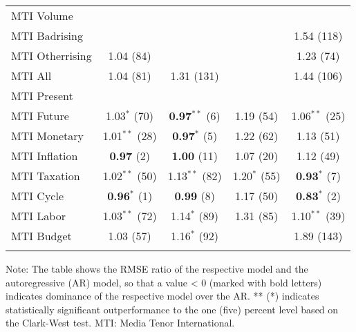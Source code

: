 \begin{table}[!htbp]
\begin{tabular}{@{\extracolsep{5pt}} lcccc}
MTI Volume &  &  &  &  \\ 
MTI Badrising &  &  &  & 1.54 (118) \\ 
MTI Otherrising & 1.04 (84) &  &  & 1.23 (74) \\ 
MTI All & 1.04 (81) & 1.31 (131) &  & 1.44 (106) \\ 
MTI Present &  &  &  &  \\ 
MTI Future & 1.03$^{*}$ (70) & \textbf{0.97$^{**}$} (6) & 1.19 (54) & 1.06$^{**}$ (25) \\ 
MTI Monetary & 1.01$^{**}$ (28) & \textbf{0.97$^{*}$} (5) & 1.22 (62) & 1.13 (51) \\ 
MTI Inflation & \textbf{0.97} (2) & \textbf{1.00} (11) & 1.07 (20) & 1.12 (49) \\ 
MTI Taxation & 1.02$^{**}$ (50) & 1.13$^{**}$ (82) & 1.20$^{*}$ (55) & \textbf{0.93$^{*}$} (7) \\ 
MTI Cycle & \textbf{0.96$^{*}$} (1) & \textbf{0.99} (8) & 1.17 (50) & \textbf{0.83$^{*}$} (2) \\ 
MTI Labor & 1.03$^{**}$ (72) & 1.14$^{*}$ (89) & 1.31 (85) & 1.10$^{**}$ (39) \\ 
MTI Budget & 1.03 (57) & 1.16$^{*}$ (92) &  & 1.89 (143) \\ 
\hline \\[-1.8ex] 

\end{tabular} 
\begin{flushleft}
Note: The table shows the RMSE ratio of the respective model and the autoregressive (AR) model, so that a value < 0 (marked with bold letters) 
              indicates dominance of the respective model over the AR. ** (*) indicates statistically significant outperformance 
              to the one (five) percent level based on the Clark-West test. MTI: Media Tenor International.
							\end{flushleft}
\end{table} 

